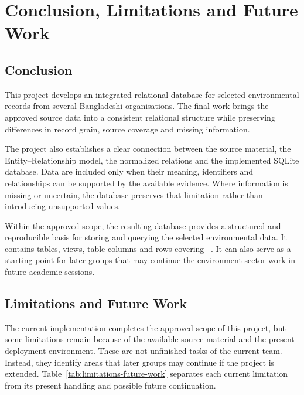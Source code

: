 \section{Conclusion, Limitations and Future Work}
\label{sec:cfw}

\subsection{Conclusion}

This project develops an integrated relational database for selected
environmental records from several Bangladeshi organisations. The final work
brings the approved source data into a consistent relational structure while
preserving differences in record grain, source coverage and missing
information.

The project also establishes a clear connection between the source material,
the Entity--Relationship model, the normalized relations and the implemented
SQLite database. Data are included only when their meaning, identifiers and
relationships can be supported by the available evidence. Where information
is missing or uncertain, the database preserves that limitation rather than
introducing unsupported values.

Within the approved scope, the resulting database provides a structured and
reproducible basis for storing and querying the selected environmental data.
It contains \mDbTables{} tables, \mDbViews{} views, \mDbColumns{} table columns
and \mDbRows{} rows covering \mYearMin--\mYearMax. It can also serve as a
starting point for later groups that may continue the environment-sector work
in future academic sessions.

\subsection{Limitations and Future Work}
\label{subsec:future}

The current implementation completes the approved scope of this project, but
some limitations remain because of the available source material and the
present deployment environment. These are not unfinished tasks of the current
team. Instead, they identify areas that later groups may continue if the
project is extended. Table~\ref{tab:limitations-future-work} separates each
current limitation from its present handling and possible future continuation.

